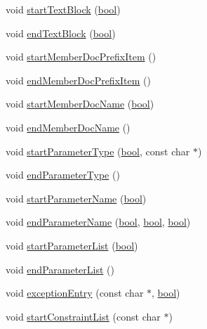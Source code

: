 \begin{DoxyCompactItemize}
void \hyperlink{class_latex_generator_aecbc8d579dde1ce7f186d1ffe31340e4}{start\+Text\+Block} (\hyperlink{qglobal_8h_a1062901a7428fdd9c7f180f5e01ea056}{bool})
\item 
void \hyperlink{class_latex_generator_a57dadc601e009ee68a09494b3d400caa}{end\+Text\+Block} (\hyperlink{qglobal_8h_a1062901a7428fdd9c7f180f5e01ea056}{bool})
\item 
void \hyperlink{class_latex_generator_a6d8f9a15963805434419a016ffbe9219}{start\+Member\+Doc\+Prefix\+Item} ()
\item 
void \hyperlink{class_latex_generator_a17d04d4fbf1106ab3e32053830b65a55}{end\+Member\+Doc\+Prefix\+Item} ()
\item 
void \hyperlink{class_latex_generator_a766f5d12e18478011232ee61c796f019}{start\+Member\+Doc\+Name} (\hyperlink{qglobal_8h_a1062901a7428fdd9c7f180f5e01ea056}{bool})
\item 
void \hyperlink{class_latex_generator_a713efa446810af93ba9b8c3aaf91117c}{end\+Member\+Doc\+Name} ()
\item 
void \hyperlink{class_latex_generator_a90a51ed6c4e424d3cf86ff1d61e8126c}{start\+Parameter\+Type} (\hyperlink{qglobal_8h_a1062901a7428fdd9c7f180f5e01ea056}{bool}, const char $\ast$)
\item 
void \hyperlink{class_latex_generator_a65c0693470afbba9f9cb4c013e3029cc}{end\+Parameter\+Type} ()
\item 
void \hyperlink{class_latex_generator_a6491b06249ad6fba41a74ef88392abe9}{start\+Parameter\+Name} (\hyperlink{qglobal_8h_a1062901a7428fdd9c7f180f5e01ea056}{bool})
\item 
void \hyperlink{class_latex_generator_a01834cb7728e046c253ab8a86efbfdb1}{end\+Parameter\+Name} (\hyperlink{qglobal_8h_a1062901a7428fdd9c7f180f5e01ea056}{bool}, \hyperlink{qglobal_8h_a1062901a7428fdd9c7f180f5e01ea056}{bool}, \hyperlink{qglobal_8h_a1062901a7428fdd9c7f180f5e01ea056}{bool})
\item 
void \hyperlink{class_latex_generator_a43b8d2c9eaee906a8db13b6191a774b1}{start\+Parameter\+List} (\hyperlink{qglobal_8h_a1062901a7428fdd9c7f180f5e01ea056}{bool})
\item 
void \hyperlink{class_latex_generator_a1fc0b7df8467ffd55521e9dfeceaf280}{end\+Parameter\+List} ()
\item 
void \hyperlink{class_latex_generator_aefc737619fba908076b28515814983a2}{exception\+Entry} (const char $\ast$, \hyperlink{qglobal_8h_a1062901a7428fdd9c7f180f5e01ea056}{bool})
\item 
void \hyperlink{class_latex_generator_a675d59502d27b460e2387404a98a6dcd}{start\+Constraint\+List} (const char $\ast$)

\end{DoxyCompactItemize}
